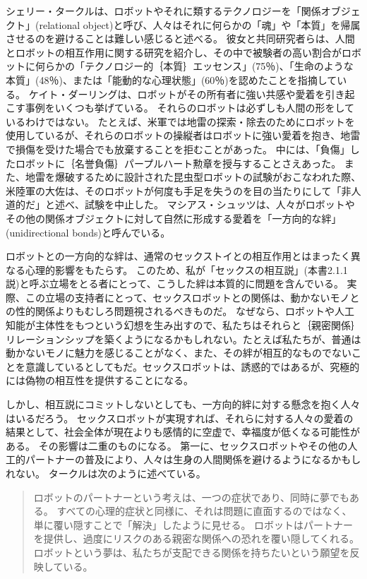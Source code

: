 \documentclass[paper=a4,book,openany]{jlreq}
\newcommand{\ig}[1]{}           %
\begin{document}
シェリー・タークルは、ロボットやそれに類するテクノロジーを「関係オブジェクト」(relational object)と呼び、人々はそれに何らかの「魂」や「本質」を帰属させるのを避けることは難しい感じると述べる。
彼女と共同研究者らは、人間とロボットの相互作用に関する研究を紹介し、その中で被験者の高い割合がロボットに何らかの「テクノロジー的｛本質｝{エッセンス}」(75％)、「生命のような本質」(48％)、または「能動的な心理状態」(60％)を認めたことを指摘している\citep[p.349]{turkle18:_relat_artif_child_elder}。
ケイト・ダーリング\ig{Kate Darling}は、ロボットがその所有者に強い共感や愛着を引き起こす事例をいくつも挙げている。
それらのロボットは必ずしも人間の形をしているわけではない。
たとえば、米軍では地雷の探索・除去のためにロボットを使用しているが、それらのロボットの操縦者はロボットに強い愛着を抱き、地雷で損傷を受けた場合でも放棄することを拒むことがあった。
中には、「負傷」したロボットに｛名誉負傷｝{パープルハート}勲章を授与することさえあった。
また、地雷を爆破するために設計された昆虫型ロボットの試験がおこなわれた際、米陸軍の大佐は、そのロボットが何度も手足を失うのを目の当たりにして「非人道的だ」と述べ、試験を中止した\citep{darling16:_exten_legal_protec_social_robot}。
マシアス・シュッツは、人々がロボットやその他の関係オブジェクトに対して自然に形成する愛着を「一方向的な絆」(unidirectional bonds)と呼んでいる\citep{scheutz12:_inher_danger_unidir_emotion_bonds}。

ロボットとの一方向的な絆は、通常のセックストイとの相互作用とはまったく異なる心理的影響をもたらす。
このため、私が「セックスの相互説」(本書2.1.1説)と呼ぶ立場をとる者にとって、こうした絆は本質的に問題を含んでいる。
実際、この立場の支持者にとって、セックスロボットとの関係は、動かないモノとの性的関係よりもむしろ問題視されるべきものだ。
なぜなら、ロボットや人工知能が主体性をもつという幻想を生み出すので、私たちはそれらと｛親密関係｝{リレーションシップ}を築くようになるかもしれない。たとえば私たちが、普通は動かないモノに魅力を感じることがなく、また、その絆が相互的なものでないことを意識しているとしてもだ。セックスロボットは、誘惑的ではあるが、究極的には偽物の相互性を提供することになる。

しかし、相互説にコミットしないとしても、一方向的絆に対する懸念を抱く人々はいるだろう。
セックスロボットが実現すれば、それらに対する人々の愛着の結果として、社会全体が現在よりも感情的に空虚で、幸福度が低くなる可能性がある。
その影響は二重のものになる。
第一に、セックスロボットやその他の人工的パートナーの普及により、人々は生身の人間関係を避けるようになるかもしれない。
タークルは次のように述べている。

\begin{quote}
ロボットのパートナーという考えは、一つの症状であり、同時に夢でもある。
すべての心理的症状と同様に、それは問題に直面するのではなく、単に覆い隠すことで「解決」したように見せる。
ロボットはパートナーを提供し、過度にリスクのある親密な関係への恐れを覆い隠してくれる。
ロボットという夢は、私たちが支配できる関係を持ちたいという願望を反映している。
\citep[p.285]{turkle11:_alone_toget}
\end{quote}
\end{document}
